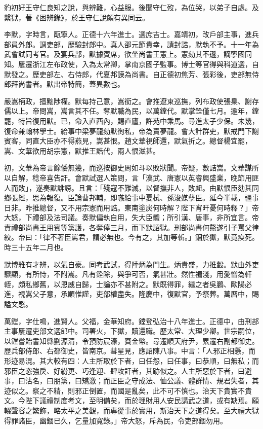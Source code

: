 \begin{pinyinscope}
豹初好王守仁良知之說，與辨難，心益服。後聞守仁歿，為位哭，以弟子自處。及繫獄，著《困辨錄》，於王守仁說頗有異同云。

李默，字時言，甌寧人。正德十六年進士。選庶吉士。嘉靖初，改戶部主事，進兵部員外郎。調吏部，歷驗封郎中。真人邵元節貴幸，請封誥，默執不予。十一年為武會試同考官。及宴兵部，默據賓席，欲坐尚書王憲上。憲劾其不遜，謫寧國同知。屢遷浙江左布政使，入為太常卿，掌南京國子監事。博士等官得與科道選，自默發之。歷吏部左、右侍郎，代夏邦謨為尚書。自正德初焦芳、張彩後，吏部無侍郎拜尚書者。默出帝特簡，蓋異數也。

嚴嵩柄政，擅黜陟權。默每持己意，嵩銜之。會推遼東巡撫，列布政使張臬、謝存儒以上。帝問嵩，嵩言其不任。奪默職為民，以萬鏜代。默掌銓僅七月。逾年，鏜罷，特旨復用默。已，命入直西內，賜直廬，許苑中乘馬。尋進太子少保。未幾，復命兼翰林學士。給事中梁夢龍劾默徇私，帝為責夢龍。會大計群吏，默戒門下謝賓客，同直大臣亦不得燕見，嵩甚恨。趙文華視師還，默氣折之。總督楊宜罷，嵩、文華欲用胡宗憲，默推王誥代，兩人恨滋甚。

初，文華為帝言餘倭無幾，而巡按御史周如斗以敗狀聞。帝疑，數詰嵩。文華謀所以自解，稔帝喜告訐。會默試選人策問，言「漢武、唐憲以英睿興盛業，晚節用匪人而敗」，遂奏默誹謗。且言：「殘寇不難滅，以督撫非人，敗衄。由默恨臣劾其同鄉張經，思為報復。臣論曹邦輔，即嗾給事中夏栻、孫浚媒孽臣。延今半載，疆事日非。昨推總督，又不用宗憲而用誥。東南塗炭何時解？陛下宵旰憂何時釋？」帝大怒，下禮部及法司議。奏默偏執自用，失大臣體；所引漢、唐事，非所宜言。帝責禮部尚書王用賓等黨護，各奪俸三月，而下默詔獄。刑部尚書何鰲遂引子罵父律絞。帝曰：「律不著臣罵君，謂必無也。今有之，其加等斬。」錮於獄，默竟瘐死。時三十五年二月也。

默博雅有才辨，以氣自豪。同考武試，得陸炳為門生。炳貴盛，力推轂。默由外吏驟顯，有所恃，不附嵩。凡有銓除，與爭可否，氣甚壯。然性褊淺，用愛憎為軒輊，頗私鄉舊，以恩威自歸，士論亦不甚附之。默既得罪，繼之者吳鵬、歐陽必進，視嵩父子意，承順惟謹，吏部權盡失。隆慶中，復默官，予祭葬。萬曆中，賜謚文愍。

萬鏜，字仕鳴，進賢人。父福，金華知府。鏜登弘治十八年進士。正德中，由刑部主事屢遷吏部文選郎中。司署火，下獄，贖還職。歷太常、大理少卿。世宗嗣位，以鏜嘗貽書知縣劉源清，令預防宸濠，賚金幣。尋遷順天府尹，累遷右副都御史。歷兵部侍郎、右都御史，皆南京。彗星見，應詔陳八事。中言：「人邪正相懸，而形迹易混。其大較有四：人主所取於下者，曰任怨，曰任事，曰恭順，曰無私；而邪臣之恣強戾、好紛更、巧逢迎、肆攻訐者，其跡似之。人主所惡於下者，曰避事，曰沽名，曰朋黨，曰矯激；而正臣之守成法、恤公議、體群情、規君失者，其迹似之。察之不精，則邪正倒置，而國是亂矣，此不可不慎也。治天下貴實不貴文。今陛下議禮制度考文，至明備矣，而於理財用人安民講武之道，或有缺焉。願輟聲容之繁飾，略太平之美觀，而專從事於實用，斯治天下之道得矣。至大禮大獄得罪諸臣，幽錮已久，乞量加寬錄。」帝大怒，斥為民，令吏部錮勿用。


\end{pinyinscope}

